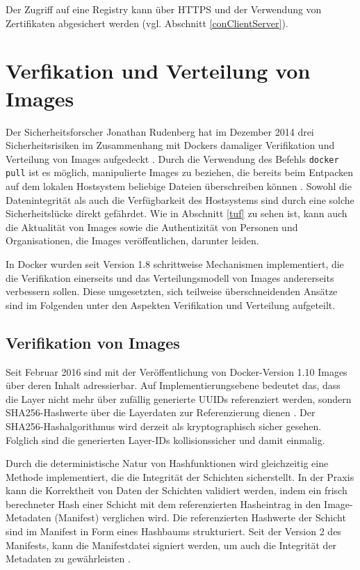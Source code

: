 \documentclass[../main.tex]{subfiles}
\begin{document}
    Der Zugriff auf eine Registry kann über \acrshort{HTTPS} und der Verwendung von Zertifikaten abgesichert werden \cite{dockerRegistry} (vgl. Abschnitt \ref{conClientServer}).

  \section{Verfikation und Verteilung von Images}
    Der Sicherheitsforscher Jonathan Rudenberg hat im Dezember 2014 drei Sicherheitsrisiken im Zusammenhang mit Dockers damaliger Verifikation und Verteilung von Images aufgedeckt \cite{githubRegistryV1Issues}\cite{registryV1IssuesRudenberg}. Durch die Verwendung des Befehls \texttt{docker pull} ist es möglich, manipulierte Images zu beziehen, die bereits beim Entpacken auf dem lokalen Hostsystem beliebige Dateien überschreiben können \cite{registryV1IssuesRedHat}. Sowohl die Datenintegrität als auch die Verfügbarkeit des Hostsystems sind durch eine solche Sicherheitslücke direkt gefährdet. Wie in Abschnitt \ref{tuf} zu sehen ist, kann auch die Aktualität von Images sowie die Authentizität von Personen und Organisationen, die Images veröffentlichen, darunter leiden.

    In Docker wurden seit Version 1.8 schrittweise Mechanismen implementiert, die die Verifikation einerseits und das Verteilungsmodell von Images andererseits verbessern sollen. Diese umgesetzten, sich teilweise überschneidenden Ansätze sind im Folgenden unter den Aspekten Verifikation und Verteilung aufgeteilt.

    \subsection{Verifikation von Images}
      Seit Februar 2016 sind mit der Veröffentlichung von Docker-Version 1.10 Images über deren Inhalt adressierbar. Auf Implementierungsebene bedeutet das, dass die Layer nicht mehr über zufällig generierte \acrshort{UUID}s referenziert werden, sondern SHA256-Hashwerte über die Layerdaten zur Referenzierung dienen \cite[S.16]{slideshareImageDistribution}. Der SHA256-Hashalgorithmus wird derzeit als kryptographisch sicher gesehen. Folglich sind die generierten Layer-IDs kollisionssicher und damit einmalig.

      Durch die deterministische Natur von Hashfunktionen wird gleichzeitig eine Methode implementiert, die die Integrität der Schichten sicherstellt. In der Praxis kann die Korrektheit von Daten der Schichten validiert werden, indem ein frisch berechneter Hash einer Schicht mit dem referenzierten Hasheintrag in den Image-Metadaten (Manifest) verglichen wird. Die referenzierten Hashwerte der Schicht sind im Manifest in Form eines Hashbaums strukturiert. Seit der Version 2 des Manifests, kann die Manifestdatei signiert werden, um auch die Integrität der Metadaten zu gewährleisten \cite{githubImageManifest21}.
\end{document}
